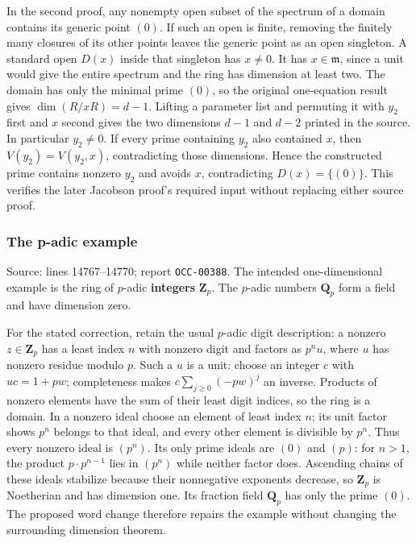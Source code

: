 In the second proof, any nonempty open subset of the spectrum of a domain contains its generic point \((0)\). If such an open is finite, removing the finitely many closures of its other points leaves the generic point as an open singleton. A standard open \(D(x)\) inside that singleton has \(x\ne0\). It has \(x\in\mathfrak m\), since a unit would give the entire spectrum and the ring has dimension at least two. The domain has only the minimal prime \((0)\), so the original one-equation result gives \(\dim(R/xR)=d-1\). Lifting a parameter list and permuting it with \(y_2\) first and \(x\) second gives the two dimensions \(d-1\) and \(d-2\) printed in the source. In particular \(y_2\ne0\). If every prime containing \(y_2\) also contained \(x\), then \(V(y_2)=V(y_2,x)\), contradicting those dimensions. Hence the constructed prime contains nonzero \(y_2\) and avoids \(x\), contradicting \(D(x)=\{(0)\}\). This verifies the later Jacobson proof's required input without replacing either source proof.

\subsubsection{The p-adic example}\label{algebra-proof-004-the-p-adic-example}

Source: lines 14767--14770; report \texttt{OCC-00388}. The intended one-dimensional example is the ring of \(p\)-adic \textbf{integers} \(\mathbf Z_p\). The \(p\)-adic numbers \(\mathbf Q_p\) form a field and have dimension zero.

For the stated correction, retain the usual \(p\)-adic digit description: a nonzero \(z\in\mathbf Z_p\) has a least index \(n\) with nonzero digit and factors as \(p^n u\), where \(u\) has nonzero residue modulo \(p\). Such a \(u\) is a unit: choose an integer \(c\) with \(uc=1+pw\); completeness makes \(c\sum_{j\geq0}(-pw)^j\) an inverse. Products of nonzero elements have the sum of their least digit indices, so the ring is a domain. In a nonzero ideal choose an element of least index \(n\); its unit factor shows \(p^n\) belongs to that ideal, and every other element is divisible by \(p^n\). Thus every nonzero ideal is \((p^n)\). Its only prime ideals are \((0)\) and \((p)\): for \(n>1\), the product \(p\cdot p^{n-1}\) lies in \((p^n)\) while neither factor does. Ascending chains of these ideals stabilize because their nonnegative exponents decrease, so \(\mathbf Z_p\) is Noetherian and has dimension one. Its fraction field \(\mathbf Q_p\) has only the prime \((0)\). The proposed word change therefore repairs the example without changing the surrounding dimension theorem.

